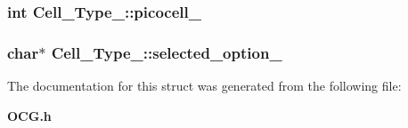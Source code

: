 \subsubsection[{picocell\_\-}]{\setlength{\rightskip}{0pt plus 5cm}int {\bf Cell\_\-Type\_\-::picocell\_\-}}\label{structCell__Type___946d87df426adbd293e1047dd96a3240}


\subsubsection[{selected\_\-option\_\-}]{\setlength{\rightskip}{0pt plus 5cm}char$\ast$ {\bf Cell\_\-Type\_\-::selected\_\-option\_\-}}\label{structCell__Type___919caef7ba7f4d0437cbfaebb50c7295}




The documentation for this struct was generated from the following file:\begin{CompactItemize}
\item 
{\bf OCG.h}\end{CompactItemize}
